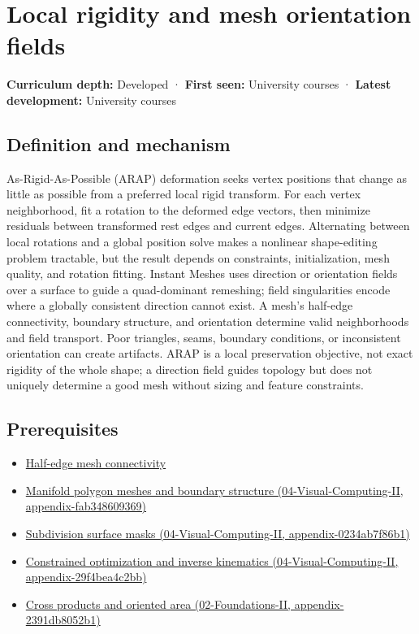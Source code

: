 \hypertarget{appendix-7107009c505b}{}
\section{Local rigidity and mesh orientation fields}\label{appendix-7107009c505b-local-rigidity-and-mesh-orientation-fields}

\textbf{Curriculum depth:} Developed · \textbf{First seen:} University courses · \textbf{Latest development:} University courses

\subsection{Definition and mechanism}\label{appendix-7107009c505b-definition-and-mechanism}

As-Rigid-As-Possible (ARAP) deformation seeks vertex positions that change as little as possible from a preferred local rigid transform. For each vertex neighborhood, fit a rotation to the deformed edge vectors, then minimize residuals between transformed rest edges and current edges. Alternating between local rotations and a global position solve makes a nonlinear shape-editing problem tractable, but the result depends on constraints, initialization, mesh quality, and rotation fitting. Instant Meshes uses direction or orientation fields over a surface to guide a quad-dominant remeshing; field singularities encode where a globally consistent direction cannot exist. A mesh's half-edge connectivity, boundary structure, and orientation determine valid neighborhoods and field transport. Poor triangles, seams, boundary conditions, or inconsistent orientation can create artifacts. ARAP is a local preservation objective, not exact rigidity of the whole shape; a direction field guides topology but does not uniquely determine a good mesh without sizing and feature constraints.

\subsection{Prerequisites}\label{appendix-7107009c505b-prerequisites}

\begin{itemize}
\tightlist
\item
  \hyperref[appendix-1aea26b2307f]{Half-edge mesh connectivity}
\item
  \href{../04-Visual-Computing-II/main.pdf\#nameddest=appendix-fab348609369}{Manifold polygon meshes and boundary structure (04-Visual-Computing-II, appendix-fab348609369)}
\item
  \href{../04-Visual-Computing-II/main.pdf\#nameddest=appendix-0234ab7f86b1}{Subdivision surface masks (04-Visual-Computing-II, appendix-0234ab7f86b1)}
\item
  \href{../04-Visual-Computing-II/main.pdf\#nameddest=appendix-29f4bea4c2bb}{Constrained optimization and inverse kinematics (04-Visual-Computing-II, appendix-29f4bea4c2bb)}
\item
  \href{../02-Foundations-II/main.pdf\#nameddest=appendix-2391db8052b1}{Cross products and oriented area (02-Foundations-II, appendix-2391db8052b1)}
\end{itemize}

